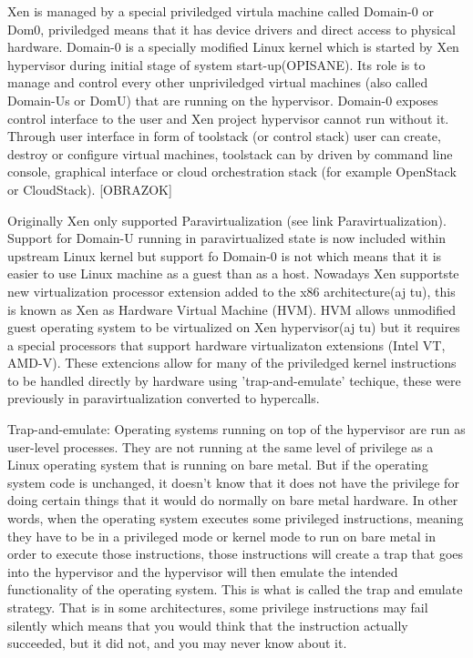 Xen is managed by a special priviledged virtula machine called Domain-0 or Dom0, priviledged means that it has device drivers and direct access to physical hardware. Domain-0 is a specially modified Linux kernel which is started by Xen hypervisor during initial stage of system start-up(OPISANE). Its role is to manage and control every other unpriviledged virtual machines (also called Domain-Us or DomU) that are running on the hypervisor. Domain-0 exposes control interface to the user and Xen project hypervisor cannot run without it. Through user interface in form of toolstack (or control stack) user can create, destroy or configure virtual machines, toolstack can by driven by command line console, graphical interface or cloud orchestration stack (for example OpenStack or CloudStack). [OBRAZOK]

Originally Xen only supported Paravirtualization (see link Paravirtualization). Support for Domain-U running in paravirtualized state is now included within upstream Linux kernel but support fo Domain-0 is not which means that it is easier to use Linux machine as a guest than as a host. Nowadays Xen supportste new virtualization processor extension added to the x86 architecture(aj tu), this is known as Xen as Hardware Virtual Machine (HVM). HVM allows unmodified guest operating system to be virtualized on Xen hypervisor(aj tu) but it requires a special processors that support hardware virtualizaton extensions (Intel VT, AMD-V). These extencions allow for many of the priviledged kernel instructions to be handled directly by hardware using 'trap-and-emulate' techique, these were previously in paravirtualization converted to hypercalls.

Trap-and-emulate: Operating systems running on top of the hypervisor are run as user-level processes. They are not running at the same level of privilege as a Linux operating system that is running on bare metal. But if the operating system code is unchanged, it doesn’t know that it does not have the privilege for doing certain things that it would do normally on bare metal hardware. In other words, when the operating system executes some privileged instructions, meaning they have to be in a privileged mode or kernel mode to run on bare metal in order to execute those instructions, those instructions will create a trap that goes into the hypervisor and the hypervisor will then emulate the intended functionality of the operating system. This is what is called the trap and emulate strategy. That is in some architectures, some privilege instructions may fail silently which means that you would think that the instruction actually succeeded, but it did not, and you may never know about it.

